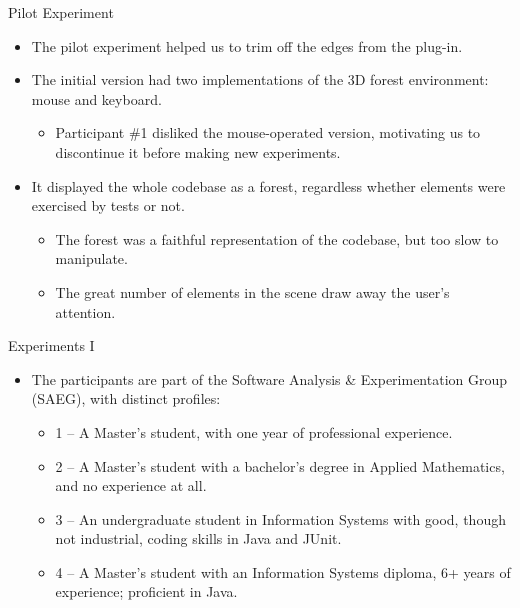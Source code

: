 \documentclass[handout]{beamer}
\begin{document}
\begin{frame}{Pilot Experiment}
    \begin{itemize}
        \item The pilot experiment helped us to trim off the edges from the
        plug-in.
        \item The initial version had two implementations of the 3D
        forest environment: mouse and keyboard.
        \begin{itemize}
            \item Participant \#1 disliked the mouse-operated version,
            motivating us to discontinue it before making new experiments.
        \end{itemize}
        \item It displayed the whole codebase as a forest, regardless whether
        elements were exercised by tests or not.
        \begin{itemize}
            \item The forest was a faithful representation of the codebase,
            but too slow to manipulate.
            \item The great number of elements in the scene draw away the user's
            attention.
        \end{itemize}
    \end{itemize}
\end{frame}

\begin{frame}{Experiments I}
    \begin{itemize}
        \item The participants are part of the Software Analysis \&
        Experimentation Group (SAEG), with distinct profiles:
            \begin{itemize}
                \item 1 -- A Master's student, with one year of professional
                experience.
                \item 2 -- A Master's student with a bachelor's degree in
                Applied Mathematics, and no experience at all.
                \item 3 -- An undergraduate student in Information Systems with
                good, though not industrial, coding skills in Java and JUnit.
                \item 4 -- A Master's student with an Information Systems
                diploma, 6+ years of experience; proficient in Java.
            \end{itemize}
    \end{itemize}
\end{frame}
\end{document}
